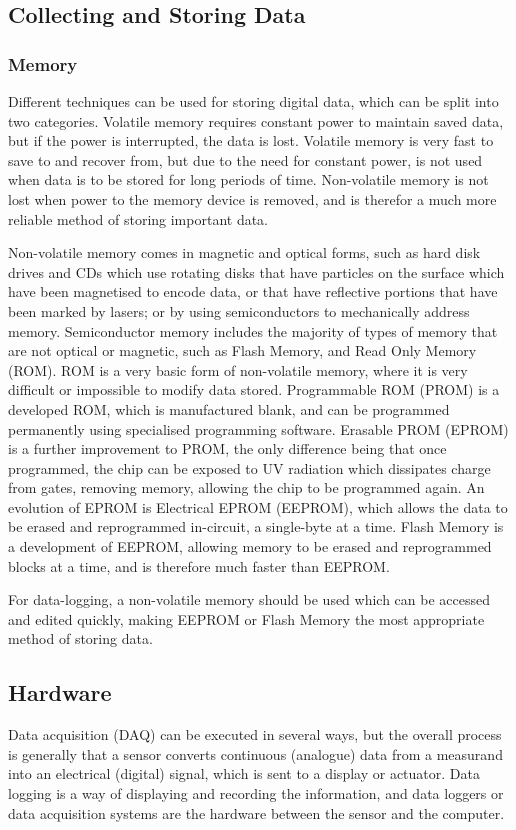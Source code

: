 
\subsection{Collecting and Storing Data}
\subsubsection{Memory}
Different techniques can be used for storing digital data, which can be split into two categories. Volatile memory requires constant power to maintain saved data, but if the power is interrupted, the data is lost. Volatile memory is very fast to save to and recover from, but due to the need for constant power, is not used when data is to be stored for long periods of time. Non-volatile memory is not lost when power to the memory device is removed, and is therefor a much more reliable method of storing important data. 

Non-volatile memory comes in magnetic and optical forms, such as hard disk drives and CDs which use rotating disks that have particles on the surface which have been magnetised to encode data, or that have reflective portions that have been marked by lasers; or by using semiconductors to mechanically address memory. Semiconductor memory includes the majority of types of memory that are not optical or magnetic, such as Flash Memory, and Read Only Memory (ROM). ROM is a very basic form of non-volatile memory, where it is very difficult or impossible to modify data stored. Programmable ROM (PROM) is a developed ROM, which is manufactured blank, and can be programmed permanently using specialised programming software. Erasable PROM (EPROM) is a further improvement to PROM, the only difference being that once programmed, the chip can be exposed to UV radiation which dissipates charge from gates, removing memory, allowing the chip to be programmed again. An evolution of EPROM is Electrical EPROM (EEPROM), which allows the data to be erased and reprogrammed in-circuit, a single-byte at a time. Flash Memory is a development of EEPROM, allowing memory to be erased and reprogrammed blocks at a time, and is therefore much faster than EEPROM.

For data-logging, a non-volatile memory should be used which can be accessed and edited quickly, making EEPROM or Flash Memory the most appropriate method of storing data. 

\subsection{Hardware}
Data acquisition (DAQ) can be executed in several ways, but the overall process is generally that a sensor converts continuous (analogue) data from a measurand into an electrical (digital) signal, which is sent to a display or actuator. Data logging is a way of displaying and recording the information, and data loggers or data acquisition systems are the hardware between the sensor and the computer.

